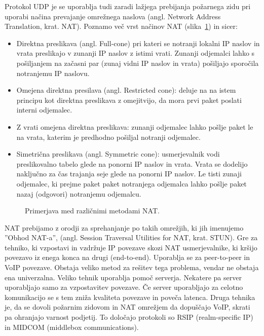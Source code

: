 \documentclass{acm_proc_article-sp}
\begin{document}
Protokol UDP je se uporablja tudi zaradi lažjega prebijanja požarnega zidu pri uporabi načina prevajanje omrežnega naslova (angl. Network Address Translation, krat. NAT). Poznamo več vrst načinov NAT (slika~\ref{fig:nat}) in sicer:
\begin{itemize}
  \item Direktna preslikava (angl. Full-cone) pri kateri se notranji lokalni IP naslov in vrata preslikajo v zunanji IP naslov z istimi vrati. Zunanji odjemalci lahko s pošiljanjem na začasni par (zunaj vidni IP naslov in vrata) pošiljajo sporočila notranjemu IP naslovu.
  \item Omejena direktna presilava (angl. Restricted cone): deluje na na istem principu kot direktna preslikava z omejitvijo, da mora prvi paket poslati interni odjemalec.
  \item Z vrati omejena direktna preslikava: zunanji odjemalec lahko pošlje paket le na vrata, katerim je predhodno pošiljal notranji odjemalec.
  \item Simetrična preslikava (angl. Symmetric cone): usmerjevalnik vodi preslikovalno tabelo glede na ponorni IP naslov in vrata. Vrata se dodelijo naključno za čas trajanja seje glede na ponorni IP naslov. Le tisti zunaji odjemalec, ki prejme paket paket notranjega odjemalca lahko pošlje paket nazaj (odgovori) notranjemu odjemalcu.
\end{itemize}

\begin{figure}
\centering
{} %
\caption{Primerjava med različnimi metodami NAT.}
\label{fig:nat}
\end{figure}

NAT prebijamo z orodji za sprehanjanje po takih omrežjih, ki jih imenujemo ''Obhod NAT-a'', (angl. Session Traversal Utilities for NAT, krat. STUN). Gre za tehniko, ki vzpostavi in vzdržuje IP povezave skozi NAT usmerjevalnike, ki kršijo povezavo iz enega konca na drugi (end-to-end). Uporablja se za peer-to-peer in VoIP povezave. Obstaja veliko metod za rešitev tega problema, vendar ne obstaja ena univerzalna. Veliko tehnik uporablja pomoč serverja. Nekatere pa server uporabljajo samo za vzpostavitev povezave. Če server uporabljajo za celotno komunikacijo se s tem zniža kvaliteta povezave in poveča latenca. Druga tehnika je, da se dovoli požarnim zidovom in NAT omrežjem da dopuščajo VoIP, skrati pa ohranjajo varnost podjetij. To določajo protokoli so RSIP (realm-specific IP) in MIDCOM (middlebox communications).
\end{document}

